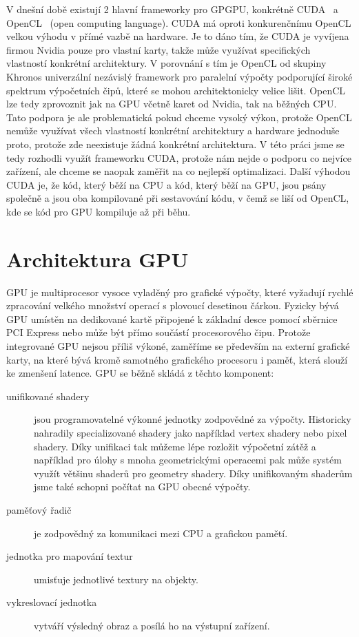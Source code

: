 V dnešní době existují 2 hlavní frameworky pro GPGPU, konkrétně CUDA~\cite{Sanders10} a OpenCL~\cite{Scarpino11} (open computing language). CUDA má oproti konkurenčnímu OpenCL velkou výhodu v přímé vazbě na hardware. Je to dáno tím, že CUDA je vyvíjena firmou Nvidia pouze pro vlastní karty, takže může využívat specifických vlastností konkrétní architektury. V porovnání s tím je OpenCL od skupiny Khronos univerzální nezávislý framework pro paralelní výpočty podporující široké spektrum výpočetních čipů, které se mohou architektonicky velice lišit. OpenCL lze tedy zprovoznit jak na GPU včetně karet od Nvidia, tak na běžných CPU. Tato podpora je ale problematická pokud chceme vysoký výkon, protože OpenCL nemůže využívat všech vlastností konkrétní architektury a hardware jednoduše proto, protože zde neexistuje žádná konkrétní architektura. V této práci jsme se tedy rozhodli využít frameworku CUDA, protože nám nejde o podporu co nejvíce zařízení, ale chceme se naopak zaměřit na co nejlepší optimalizaci. Další výhodou CUDA je, že kód, který běží na CPU a kód, který běží na GPU, jsou psány společně a jsou oba kompilované při sestavování kódu, v čemž se liší od OpenCL, kde se kód pro GPU kompiluje až při běhu.

\section{Architektura GPU}
GPU je multiprocesor vysoce vyladěný pro grafické výpočty, které vyžadují rychlé zpracování velkého množství operací s plovoucí desetinou čárkou. Fyzicky bývá GPU umístěn na dedikované kartě připojené k základní desce pomocí sběrnice PCI Express nebo může být přímo součástí procesorového čipu. Protože integrované GPU nejsou příliš výkoné, zaměříme se především na externí grafické karty, na které bývá kromě samotného grafického procesoru i paměť, která slouží ke zmenšení latence. GPU se běžně skládá z těchto komponent:
\begin{description}
\item[unifikované shadery] jsou programovatelné výkonné jednotky zodpovědné za výpočty. Historicky nahradily specializované shadery jako například vertex shadery nebo pixel shadery. Díky unifikaci tak můžeme lépe rozložit výpočetní zátěž a například pro úlohy s mnoha geometrickými operacemi pak může systém využít většinu shaderů pro geometry shadery. Díky unifikovaným shaderům jsme také schopni počítat na GPU obecné výpočty.
\item[paměťový řadič] je zodpovědný za komunikaci mezi CPU a grafickou pamětí.
\item[jednotka pro mapování textur] umisťuje jednotlivé textury na objekty.
\item[vykreslovací jednotka] vytváří výsledný obraz a posílá ho na výstupní zařízení.
\end{description}

